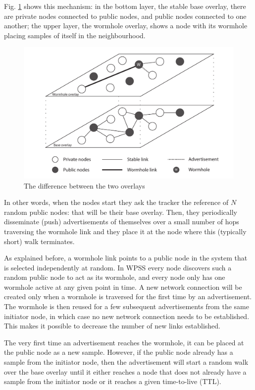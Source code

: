 Fig. \ref{fig:overlay} shows this mechanism: in the bottom layer, the stable base overlay, there are private nodes connected to public nodes, and public nodes connected to one another; the upper layer, the wormhole overlay, shows a node with its wormhole placing samples of itself in the neighbourhood.

\begin{figure}[ht]
  \centering
  \includegraphics[keepaspectratio=true, width=\textwidth]{images/overlay.pdf}\caption{The difference between the two overlays}
  \label{fig:overlay}
\end{figure}

In other words, when the nodes start they ask the tracker the reference of $N$ random public nodes: that will be their base overlay. Then, they periodically disseminate (push) advertisements of themselves over a small number of hops traversing the wormhole link and they place it at the node where this (typically short) walk terminates.

As explained before, a wormhole link points to a public node in the system that is selected independently at random. In WPSS every node discovers such a random public node to act as its wormhole, and every node only has one wormhole active at any given point in time. A new network connection will be created only when a wormhole is traversed for the first time by an advertisement. The wormhole is then reused for a few subsequent advertisements from the same initiator node, in which case no new network connection needs to be established. This makes it possible to decrease the number of new links established.

The very first time an advertisement reaches the wormhole, it can be placed at the public node as a new sample. However, if the public node already has a sample from the initiator node, then the advertisement will start a random walk over the base overlay until it either reaches a node that does not already have a sample from the initiator node or it reaches a given time-to-live (TTL)\cite{wormhole}.


